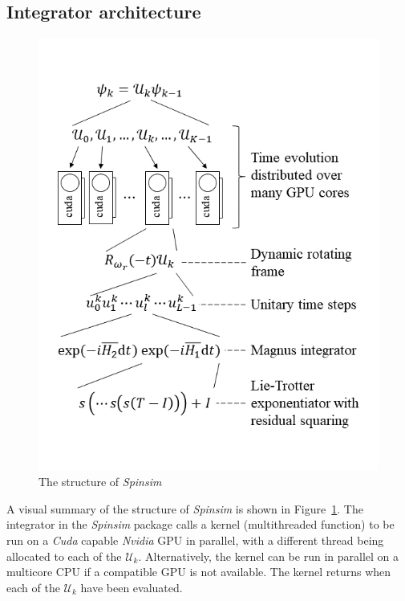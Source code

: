 \documentclass{jors}
\begin{document}
	\subsection{Integrator architecture}
		\begin{figure}[h!]
			\centering
			\includegraphics[scale=0.475]{architecture.png}
			\caption{The structure of \emph{Spinsim}}
			\label{fig:architecture}
		\end{figure}
		A visual summary of the structure of \emph{Spinsim} is shown in Figure~\ref{fig:architecture}.
		The integrator in the \emph{Spinsim} package calls a kernel (multithreaded function) to be run on a \emph{Cuda} capable \emph{Nvidia} GPU in parallel, with a different thread being allocated to each of the $ \mathcal{U}_k $.
		Alternatively, the kernel can be run in parallel on a multicore CPU if a compatible GPU is not available.
		The kernel returns when each of the $ \mathcal{U}_k $ have been evaluated.
\end{document}
